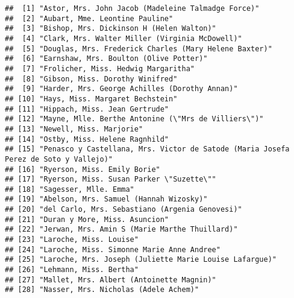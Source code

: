 \documentclass[
]{article}
\begin{document}
\begin{verbatim}
##  [1] "Astor, Mrs. John Jacob (Madeleine Talmadge Force)"                                 
##  [2] "Aubart, Mme. Leontine Pauline"                                                     
##  [3] "Bishop, Mrs. Dickinson H (Helen Walton)"                                           
##  [4] "Clark, Mrs. Walter Miller (Virginia McDowell)"                                     
##  [5] "Douglas, Mrs. Frederick Charles (Mary Helene Baxter)"                              
##  [6] "Earnshaw, Mrs. Boulton (Olive Potter)"                                             
##  [7] "Frolicher, Miss. Hedwig Margaritha"                                                
##  [8] "Gibson, Miss. Dorothy Winifred"                                                    
##  [9] "Harder, Mrs. George Achilles (Dorothy Annan)"                                      
## [10] "Hays, Miss. Margaret Bechstein"                                                    
## [11] "Hippach, Miss. Jean Gertrude"                                                      
## [12] "Mayne, Mlle. Berthe Antonine (\"Mrs de Villiers\")"                                
## [13] "Newell, Miss. Marjorie"                                                            
## [14] "Ostby, Miss. Helene Ragnhild"                                                      
## [15] "Penasco y Castellana, Mrs. Victor de Satode (Maria Josefa Perez de Soto y Vallejo)"
## [16] "Ryerson, Miss. Emily Borie"                                                        
## [17] "Ryerson, Miss. Susan Parker \"Suzette\""                                           
## [18] "Sagesser, Mlle. Emma"                                                              
## [19] "Abelson, Mrs. Samuel (Hannah Wizosky)"                                             
## [20] "del Carlo, Mrs. Sebastiano (Argenia Genovesi)"                                     
## [21] "Duran y More, Miss. Asuncion"                                                      
## [22] "Jerwan, Mrs. Amin S (Marie Marthe Thuillard)"                                      
## [23] "Laroche, Miss. Louise"                                                             
## [24] "Laroche, Miss. Simonne Marie Anne Andree"                                          
## [25] "Laroche, Mrs. Joseph (Juliette Marie Louise Lafargue)"                             
## [26] "Lehmann, Miss. Bertha"                                                             
## [27] "Mallet, Mrs. Albert (Antoinette Magnin)"                                           
## [28] "Nasser, Mrs. Nicholas (Adele Achem)"                                               

\end{verbatim}
\end{document}
